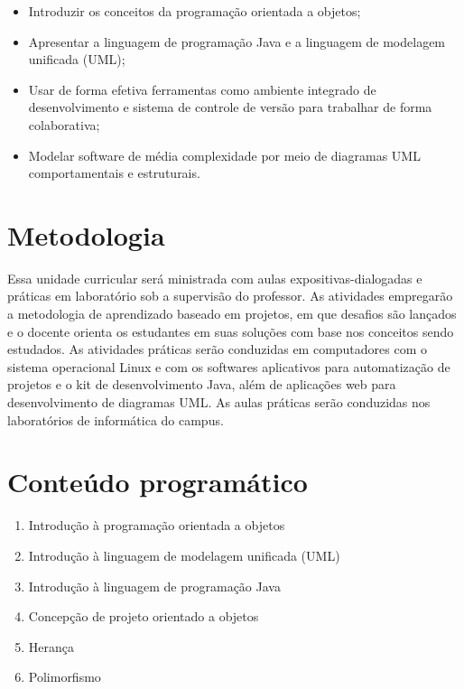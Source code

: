 \documentclass[11pt]{ifscarticle}
\begin{document}
\begin{itemize}
    \item Introduzir os conceitos da programação orientada a objetos;
    \item Apresentar a linguagem de programação Java e a linguagem de modelagem unificada (UML);
    \item Usar de forma efetiva ferramentas como ambiente integrado de desenvolvimento e sistema de controle de versão para trabalhar de forma colaborativa;
    \item Modelar software de média complexidade por meio de diagramas UML comportamentais e estruturais.
\end{itemize}



\section{Metodologia}

Essa unidade curricular será ministrada com aulas expositivas-dialogadas e práticas em laboratório sob a supervisão do professor. As atividades empregarão a metodologia de aprendizado baseado em projetos, em que desafios são lançados e o docente orienta os estudantes em suas soluções com base nos conceitos sendo estudados. As atividades práticas serão conduzidas em computadores com o sistema operacional Linux e com os softwares aplicativos para automatização de projetos e o kit de desenvolvimento Java, além de aplicações web para desenvolvimento de diagramas UML. As aulas práticas serão conduzidas nos laboratórios de informática do campus.

\section{Conteúdo programático}

\begin{enumerate}
	\item Introdução à programação orientada a objetos
	\item Introdução à linguagem de modelagem unificada (UML)
	\item Introdução à linguagem de programação Java
	\item Concepção de projeto orientado a objetos
	\item Herança
	\item Polimorfismo
\end{enumerate}


\nocite{*}

\printbibliography[heading=bibintoc,keyword={basica},title={Bibliografia básica}]%

\printbibliography[heading=bibintoc,keyword={complementar},title={Bibliografia complementar}]%
\end{document}
